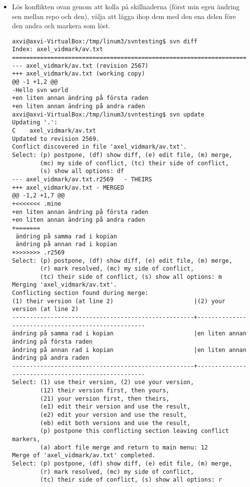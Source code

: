 \documentclass[10pt, a4paper]{article}
\begin{document}
\begin{itemize}
\item Lös konflikten ovan genom att kolla på skillnaderna (först min egen ändring sen mellan repo och den), välja att lägga ihop dem med den ena delen före den andra och markera som löst.
\begin{verbatim}
axvi@axvi-VirtualBox:/tmp/linum3/svntesting$ svn diff
Index: axel_vidmark/av.txt
===================================================================
--- axel_vidmark/av.txt	(revision 2567)
+++ axel_vidmark/av.txt	(working copy)
@@ -1 +1,2 @@
-Hello svn world
+en liten annan ändring på första raden
+en liten annan ändring på andra raden
axvi@axvi-VirtualBox:/tmp/linum3/svntesting$ svn update
Updating '.':
C    axel_vidmark/av.txt
Updated to revision 2569.
Conflict discovered in file 'axel_vidmark/av.txt'.
Select: (p) postpone, (df) show diff, (e) edit file, (m) merge,
        (mc) my side of conflict, (tc) their side of conflict,
        (s) show all options: df
--- axel_vidmark/av.txt.r2569	- THEIRS
+++ axel_vidmark/av.txt	- MERGED
@@ -1,2 +1,7 @@
+<<<<<<< .mine
+en liten annan ändring på första raden
+en liten annan ändring på andra raden
+=======
 ändring på samma rad i kopian
 ändring på annan rad i kopian
+>>>>>>> .r2569
Select: (p) postpone, (df) show diff, (e) edit file, (m) merge,
        (r) mark resolved, (mc) my side of conflict,
        (tc) their side of conflict, (s) show all options: m
Merging 'axel_vidmark/av.txt'.
Conflicting section found during merge:
(1) their version (at line 2)                       |(2) your version (at line 2)                        
----------------------------------------------------+----------------------------------------------------
ändring på samma rad i kopian                       |en liten annan ändring på första raden              
ändring på annan rad i kopian                       |en liten annan ändring på andra raden               
----------------------------------------------------+----------------------------------------------------
Select: (1) use their version, (2) use your version,
        (12) their version first, then yours,
        (21) your version first, then theirs,
        (e1) edit their version and use the result,
        (e2) edit your version and use the result,
        (eb) edit both versions and use the result,
        (p) postpone this conflicting section leaving conflict markers,
        (a) abort file merge and return to main menu: 12
Merge of 'axel_vidmark/av.txt' completed.
Select: (p) postpone, (df) show diff, (e) edit file, (m) merge,
        (r) mark resolved, (mc) my side of conflict,
        (tc) their side of conflict, (s) show all options: r

\end{verbatim}
\end{itemize}
\end{document}
